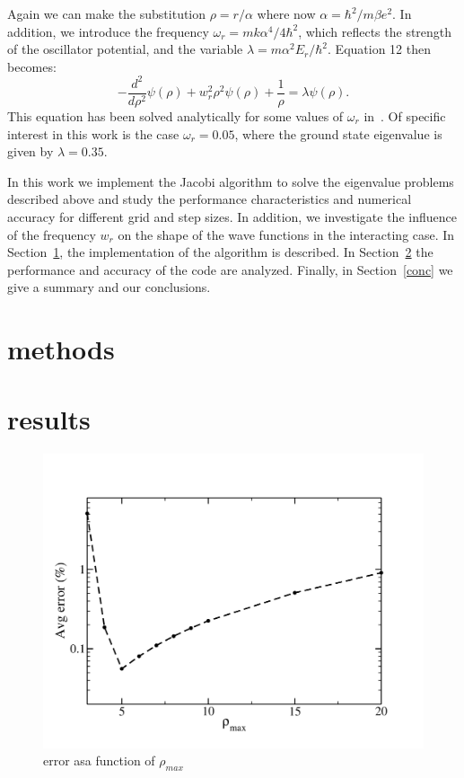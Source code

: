 \documentclass[prc,amsmath,twocolumn,superscriptaddress]{revtex4}
\begin{document}
Again we can make the substitution $\rho=r/\alpha$ where now $\alpha=\hbar^2/m\beta e^2$. In addition, we introduce the frequency $\omega_r=mk\alpha^4/4\hbar^2$, which reflects the strength of the oscillator potential, and the variable $\lambda = m\alpha^2E_r/\hbar^2$. Equation 12 then becomes:
\begin{equation}
-\frac{d^2}{d\rho^2}\psi(\rho)+w_r^2\rho^2\psi(\rho)+\frac{1}{\rho}=\lambda\psi(\rho).
\end{equation}
This equation has been solved analytically for some values of $\omega_r$ in~\cite{interact}. Of specific interest in this work is the case $\omega_r=0.05$, where the ground state eigenvalue is given by $\lambda=0.35$.

In this work we implement the Jacobi algorithm to solve the eigenvalue problems described above and study the performance characteristics and numerical accuracy for different grid and step sizes. In addition, we investigate the influence of the frequency $w_r$ on the shape of the wave functions in the interacting case. In Section~\ref{methods}, the implementation of the algorithm is described. In Section~\ref{results} the performance and accuracy of the code are analyzed. Finally, in Section~\ref{conc} we give a summary and our conclusions.

\section{methods}
\label{methods}

\section{results}
\label{results}
\begin{figure}[h]
\includegraphics[scale=0.33]{error_pmax.pdf}
\caption{error asa function of $\rho_{max}$}
\label{algorithm}
\end{figure}
\end{document}
